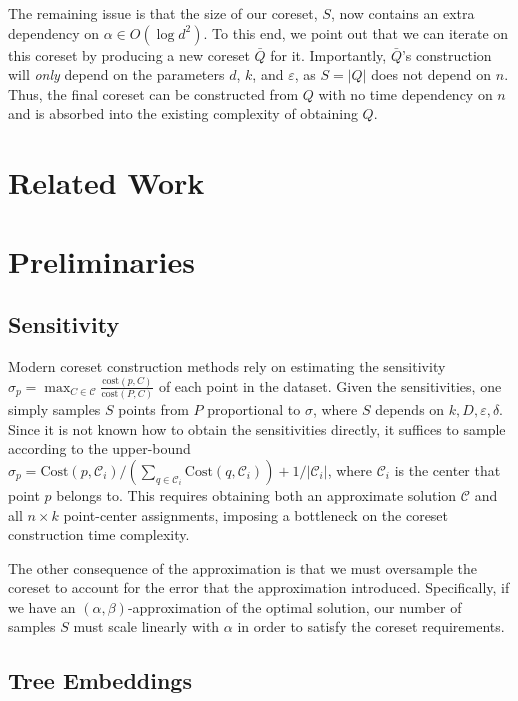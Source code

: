 \documentclass{article}
\theoremstyle{definition}
\begin{document}
The remaining issue is that the size of our coreset, $S$, now contains an extra dependency on $\alpha \in O(\log d^2)$. To this end, we point out that we can
iterate on this coreset by producing a new coreset $\bar{Q}$ for it. Importantly, $\bar{Q}$'s construction will \emph{only} depend on the parameters $d$, $k$,
and $\varepsilon$, as $S = |Q|$ does not depend on $n$. Thus, the final coreset can be constructed from $Q$ with no time dependency on $n$ and is absorbed into
the existing complexity of obtaining $Q$.

\section{Related Work}

\section{Preliminaries}
\subsection{Sensitivity}

Modern coreset construction methods rely on estimating the sensitivity $\sigma_p = \max_{C \in \mathcal{C}} \frac{\text{cost}(p, C)}{\text{cost}(P, C)}$ of each
point in the dataset. Given the sensitivities, one simply samples $S$ points from $P$ proportional to $\sigma$, where $S$ depends on $k, D, \varepsilon,
\delta$. Since it is not known how to obtain the sensitivities directly, it suffices to sample according to the upper-bound $\hat{\sigma}_p = \text{Cost}(p,
\mathcal{C}_i) / \left( \sum_{q \in \mathcal{C}_i}\text{Cost}(q, \mathcal{C}_i) \right) + 1 / |\mathcal{C}_i|$, where $\mathcal{C}_i$ is the center that point
$p$ belongs to. This requires obtaining both an approximate solution $\mathcal{C}$ and all $n \times k$ point-center assignments, imposing a bottleneck on the
coreset construction time complexity.

The other consequence of the approximation is that we must oversample the coreset to account for the error that the approximation introduced. Specifically, if
we have an $(\alpha, \beta)$-approximation of the optimal solution, our number of samples $S$ must scale linearly with $\alpha$ in order to satisfy the coreset
requirements.

\subsection{Tree Embeddings}
\end{document}
